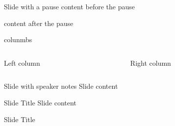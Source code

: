 \documentclass[
  ignorenonframetext,
]{beamer}
\providecommand{\tightlist}{%
  \setlength{\itemsep}{0pt}\setlength{\parskip}{0pt}}\usepackage{longtable,booktabs,array}
\begin{document}
\begin{frame}{Slide with a pause}
\protect\hypertarget{slide-with-a-pause}{}
content before the pause

\pause

content after the pause
\end{frame}

\begin{frame}{colunmbs}
\protect\hypertarget{colunmbs}{}
\begin{columns}[T]
\begin{column}{0.4\textwidth}
Left column
\end{column}

\begin{column}{0.6\textwidth}
Right column
\end{column}
\end{columns}
\end{frame}

\begin{frame}{Slide with speaker notes}
\protect\hypertarget{slide-with-speaker-notes}{}
Slide content

\end{frame}

\begin{frame}{Slide Title}
\protect\hypertarget{slide-title}{}
Slide content

\end{frame}

\begin{frame}{Slide Title}
\protect\hypertarget{slide-title-1}{}

\end{frame}
\end{document}
